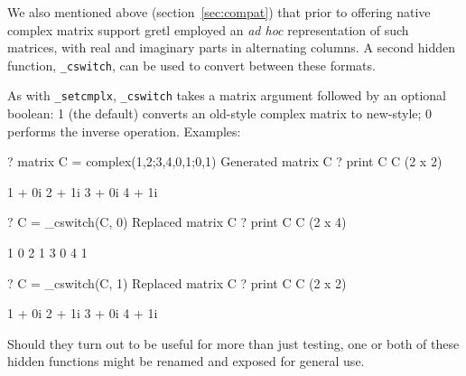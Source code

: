 \documentclass{article}
\begin{document}
We also mentioned above (section~\ref{sec:compat}) that prior to
offering native complex matrix support gretl employed an \textit{ad
  hoc} representation of such matrices, with real and imaginary parts
in alternating columns. A second hidden function, \verb|_cswitch|, can
be used to convert between these formats.

As with \verb|_setcmplx|, \verb|_cswitch| takes a matrix argument
followed by an optional boolean: 1 (the default) converts an old-style
complex matrix to new-style; 0 performs the inverse operation.
Examples:
\begin{code}
? matrix C = complex({1,2;3,4},{0,1;0,1})
Generated matrix C
? print C
C (2 x 2)

 1 + 0i   2 + 1i
 3 + 0i   4 + 1i

? C = _cswitch(C, 0)
Replaced matrix C
? print C
C (2 x 4)

  1   0   2   1
  3   0   4   1

? C = _cswitch(C, 1)
Replaced matrix C
? print C
C (2 x 2)

 1 + 0i   2 + 1i
 3 + 0i   4 + 1i
\end{code}

Should they turn out to be useful for more than just testing, one or
both of these hidden functions might be renamed and exposed for
general use.
\end{document}
